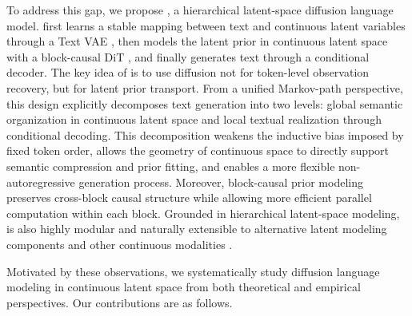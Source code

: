 To address this gap, we propose \method, a hierarchical latent-space diffusion language model. \method first learns a stable mapping between text and continuous latent variables through a Text VAE \citep{zheng2025diffusion,xu2020variational,semeniuta2017hybrid,li2020optimus,bowman2016generating,kingma2013auto}, then models the latent prior in continuous latent space with a block-causal DiT \citep{peebles2023scalable,chandrasegaran2025exploring,park2024switch,mo2023dit,liu2025bcat,cannizzaro2023towards,bandyopadhyay2025block,zhang2020invariant}, and finally generates text through a conditional decoder. The key idea of \method is to use diffusion not for token-level observation recovery, but for latent prior transport. From a unified Markov-path perspective, this design explicitly decomposes text generation into two levels: global semantic organization in continuous latent space and local textual realization through conditional decoding. This decomposition weakens the inductive bias imposed by fixed token order, allows the geometry of continuous space to directly support semantic compression and prior fitting, and enables a more flexible non-autoregressive generation process. Moreover, block-causal prior modeling preserves cross-block causal structure while allowing more efficient parallel computation within each block. Grounded in hierarchical latent-space modeling, \method is also highly modular and naturally extensible to alternative latent modeling components and other continuous modalities \citep{zheng2025diffusion,deng2026generative}.

Motivated by these observations, we systematically study diffusion language modeling in continuous latent space from both theoretical and empirical perspectives. Our contributions are as follows.


